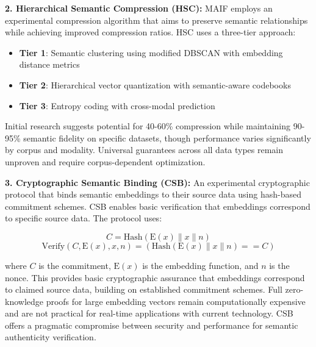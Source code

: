 \documentclass[conference]{IEEEtran}
\begin{document}
\textbf{2. Hierarchical Semantic Compression (HSC):}
MAIF employs an experimental compression algorithm that aims to preserve semantic relationships while achieving improved compression ratios. HSC uses a three-tier approach:
\begin{itemize}[leftmargin=*]
\item \textbf{Tier 1}: Semantic clustering using modified DBSCAN with embedding distance metrics
\item \textbf{Tier 2}: Hierarchical vector quantization with semantic-aware codebooks
\item \textbf{Tier 3}: Entropy coding with cross-modal prediction
\end{itemize}
Initial research suggests potential for 40-60\% compression while maintaining 90-95\% semantic fidelity on specific datasets, though performance varies significantly by corpus and modality. Universal guarantees across all data types remain unproven and require corpus-dependent optimization.

\textbf{3. Cryptographic Semantic Binding (CSB):}
An experimental cryptographic protocol that binds semantic embeddings to their source data using hash-based commitment schemes. CSB enables basic verification that embeddings correspond to specific source data. The protocol uses:

$$C = \text{Hash}(\text{E}(x) \| x \| n)$$
$$\text{Verify}(C, \text{E}(x), x, n) = (\text{Hash}(\text{E}(x) \| x \| n) == C)$$

where $C$ is the commitment, $\text{E}(x)$ is the embedding function, and $n$ is the nonce. This provides basic cryptographic assurance that embeddings correspond to claimed source data, building on established commitment schemes. Full zero-knowledge proofs for large embedding vectors remain computationally expensive and are not practical for real-time applications with current technology. CSB offers a pragmatic compromise between security and performance for semantic authenticity verification.
\end{document}
